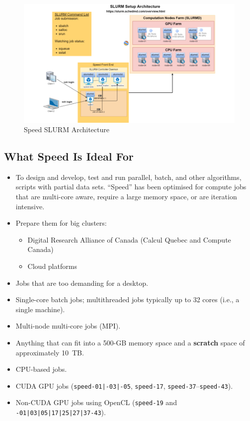 \documentclass{easychair}
\begin{document}
\begin{figure}[htpb]
\includegraphics[width=\columnwidth]{images/slurm-arch}
\caption{Speed SLURM Architecture}
\label{fig:slurm-arch}
\end{figure}


\subsection{What Speed Is Ideal For}
\label{sect:speed-is-for}

\begin{itemize}
\item
To design and develop, test and run parallel, batch, and other algorithms, 
scripts with partial data sets. ``Speed'' has been optimised for compute jobs 
that are multi-core aware, require a large memory space, or are iteration 
intensive.
\item
Prepare them for big clusters:
	\begin{itemize}
	\item 
	Digital Research Alliance of Canada (Calcul Quebec and Compute Canada)
	\item 
	Cloud platforms
	\end{itemize}
\item
Jobs that are too demanding for a desktop. 
\item
Single-core batch jobs; multithreaded jobs typically up to 32 cores (i.e., a single machine).
\item
Multi-node multi-core jobs (MPI).
\item
Anything that can fit into a 500-GB memory space and a \textbf{scratch} space of approximately 10~TB. 
\item
CPU-based jobs. 
\item
CUDA GPU jobs (\texttt{speed-01|-03|-05}, \texttt{speed-17}, \texttt{speed-37}--\texttt{speed-43}).
\item
Non-CUDA GPU jobs using OpenCL (\texttt{speed-19} and \texttt{-01|03|05|17|25|27|37-43}).
\end{itemize}
\end{document}
